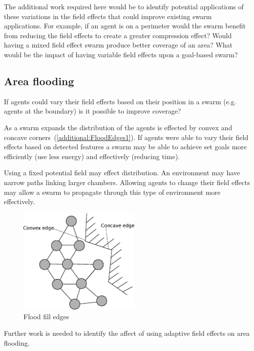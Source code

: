 The additional work required here would be to identify potential applications of these variations in the field effects that could improve existing swarm applications. For example, if an agent is on a perimeter would the swarm benefit from reducing the field effects to create a greater compression effect? Would having a mixed field effect swarm produce better coverage of an area? What would be the impact of having variable field effects upon a goal-based swarm?

\subsection{Area flooding}
If agents could vary their field effects based on their position in a swarm (e.g. agents at the boundary) is it possible to improve coverage?

As a swarm expands the distribution of the agents is effected by convex and concave corners~(\autoref{additional:FloodEdges1}). If agents were able to vary their field effects based on detected features a swarm may be able to achieve set goals more efficiently (use less energy) and effectively (reducing time).

Using a fixed potential field may effect distribution. An environment may have narrow paths linking larger chambers. Allowing agents to change their field effects may allow a swarm to propagate through this type of environment more effectively. 

\begin{figure}[H]
\begin{center}
\includegraphics[width=6cm]{CHAPTER-9/figures/FloodEdges1}
\end{center}
\caption{Flood fill edges\label{additional:FloodEdges1}}
\end{figure}

Further work is needed to identify the affect of using adaptive field effects on area flooding.
 
